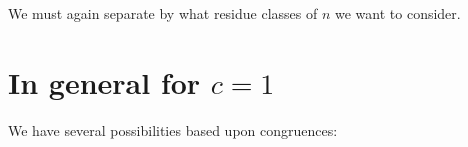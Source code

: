 \documentclass[12pt]{article}
\begin{document}
\begin{enumerate}
We must again separate by what residue classes of $n$ we want to consider.  






















\end{enumerate}


\section{In general for $c = 1$}

We have several possibilities based upon congruences:
\end{document}
